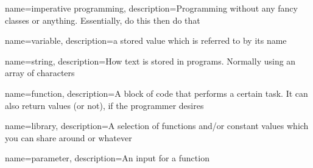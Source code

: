 {
    name={imperative programming},
    description={Programming without any fancy classes or anything. Essentially, do this then do that}
}

{
    name={variable},
    description={a stored value which is referred to by its name}
}

{
    name={string},
    description={How text is stored in programs. Normally using an array of characters}
}

{
    name={function},
    description={A block of code that performs a certain task. It can also return values (or not), if the programmer desires}
}

{
    name={library},
    description={A selection of functions and/or constant values which you can share around or whatever}
}

{
    name={parameter},
    description={An input for a function}
}
